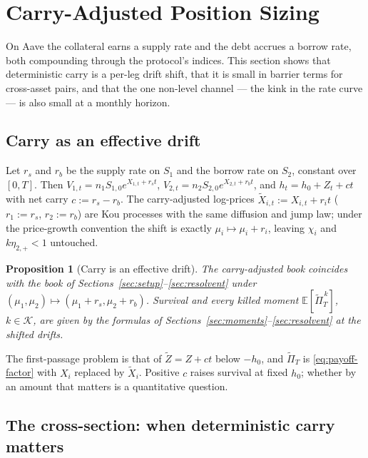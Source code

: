 \documentclass[11pt]{article}
\newcommand{\E}{\mathbb{E}}
\theoremstyle{plain}
\newtheorem{proposition}[theorem]{Proposition}
\theoremstyle{definition}
\theoremstyle{remark}
\begin{document}
\section{Carry-Adjusted Position Sizing}\label{sec:carry}

On Aave the collateral earns a supply rate and the debt accrues a borrow rate, both compounding
through the protocol's indices. This section shows that deterministic carry is a per-leg drift shift,
that it is small in barrier terms for cross-asset pairs, and that the one non-level channel --- the kink in the rate curve
--- is also small at a monthly horizon.

\subsection{Carry as an effective drift}\label{sec:carry-drift}
Let $r_s$ and $r_b$ be the supply rate on $S_1$ and the borrow rate on $S_2$, constant over $[0,T]$.
Then $V_{1,t}=n_1S_{1,0}e^{X_{1,t}+r_st}$, $V_{2,t}=n_2S_{2,0}e^{X_{2,t}+r_bt}$, and
$h_t=h_0+Z_t+ct$ with net carry $c:=r_s-r_b$. The carry-adjusted log-prices
$\widetilde X_{i,t}:=X_{i,t}+r_it$ ($r_1:=r_s$, $r_2:=r_b$) are Kou processes with the same
diffusion and jump law; under the price-growth convention the shift is exactly
$\mu_i\mapsto\mu_i+r_i$, leaving $\chi_i$ and $k\eta_{2,+}<1$ untouched.

\begin{proposition}[Carry is an effective drift]\label{prop:carry}
The carry-adjusted book coincides with the book of Sections~\ref{sec:setup}--\ref{sec:resolvent}
under $(\mu_1,\mu_2)\mapsto(\mu_1+r_s,\mu_2+r_b)$. Survival and every killed moment
$\E[\widetilde\Pi_T^{\,k}]$, $k\in\mathcal K$, are given by the formulas of
Sections~\ref{sec:moments}--\ref{sec:resolvent} at the shifted drifts.
\end{proposition}

\noindent
The first-passage problem is that of $\widetilde Z=Z+ct$ below $-h_0$, and $\widetilde\Pi_T$ is
\eqref{eq:payoff-factor} with $X_i$ replaced by $\widetilde X_i$. Positive $c$ raises survival at
fixed $h_0$; whether by an amount that matters is a quantitative question.

\subsection{The cross-section: when deterministic carry matters}\label{sec:carry-crosssection}
\end{document}
